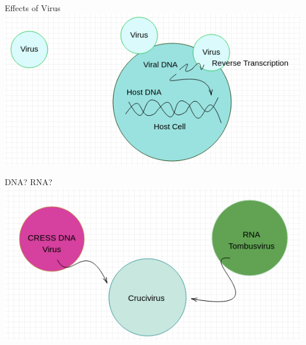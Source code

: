 \documentclass{beamer}
\begin{document}
\begin{frame}{Effects of Virus}
    \centering
    \includegraphics[scale = 0.5]{dnaMutation.png}
\end{frame}

\begin{frame}{DNA? RNA?}
    \centering
    \includegraphics[scale = 0.5]{crucivirusStructure.png}
\end{frame}
\end{document}
